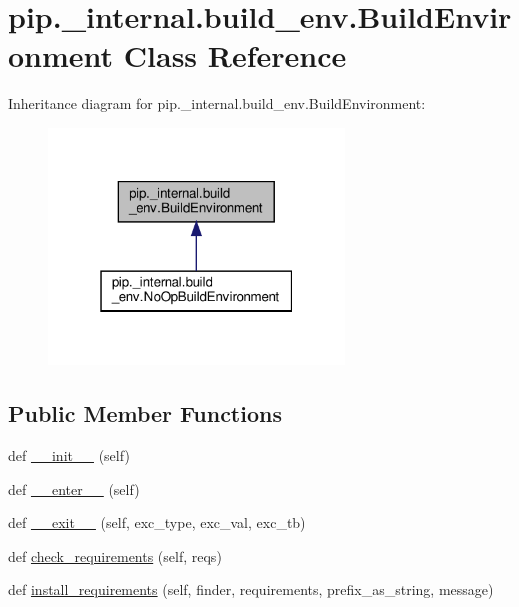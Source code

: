 \hypertarget{classpip_1_1__internal_1_1build__env_1_1BuildEnvironment}{}\section{pip.\+\_\+internal.\+build\+\_\+env.\+Build\+Environment Class Reference}
\label{classpip_1_1__internal_1_1build__env_1_1BuildEnvironment}


Inheritance diagram for pip.\+\_\+internal.\+build\+\_\+env.\+Build\+Environment\+:
\nopagebreak
\begin{figure}[H]
\begin{center}
\leavevmode
\includegraphics[width=223pt]{classpip_1_1__internal_1_1build__env_1_1BuildEnvironment__inherit__graph}
\end{center}
\end{figure}
\subsection*{Public Member Functions}
\begin{DoxyCompactItemize}
\item 
def \hyperlink{classpip_1_1__internal_1_1build__env_1_1BuildEnvironment_a66d182403333531d9929e26a1b0878bd}{\+\_\+\+\_\+init\+\_\+\+\_\+} (self)
\item 
def \hyperlink{classpip_1_1__internal_1_1build__env_1_1BuildEnvironment_a06035c3877921315fb64868d8873a3ad}{\+\_\+\+\_\+enter\+\_\+\+\_\+} (self)
\item 
def \hyperlink{classpip_1_1__internal_1_1build__env_1_1BuildEnvironment_a4c72c5b32bea9e06cc26afed2079db9d}{\+\_\+\+\_\+exit\+\_\+\+\_\+} (self, exc\+\_\+type, exc\+\_\+val, exc\+\_\+tb)
\item 
def \hyperlink{classpip_1_1__internal_1_1build__env_1_1BuildEnvironment_a7ec15d95e6dd6c0b4f5952a3b272ce15}{check\+\_\+requirements} (self, reqs)
\item 
def \hyperlink{classpip_1_1__internal_1_1build__env_1_1BuildEnvironment_af4117bb5ff8030d48842dff5362da507}{install\+\_\+requirements} (self, finder, requirements, prefix\+\_\+as\+\_\+string, message)
\end{DoxyCompactItemize}
